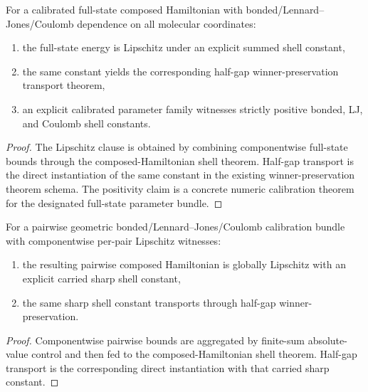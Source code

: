 \begin{theorem}\label{thm:fullstate-biomolecular-forcefield-transport}
For a calibrated full-state composed Hamiltonian with bonded/Lennard--Jones/Coulomb dependence on all molecular coordinates:
\begin{enumerate}
\item the full-state energy is Lipschitz under an explicit summed shell constant,
\item the same constant yields the corresponding half-gap winner-preservation transport theorem,
\item an explicit calibrated parameter family witnesses strictly positive bonded, LJ, and Coulomb shell constants.
\end{enumerate}
\end{theorem}

\begin{proof}
The Lipschitz clause is obtained by combining componentwise full-state bounds through the composed-Hamiltonian shell theorem. Half-gap transport is the direct instantiation of the same constant in the existing winner-preservation theorem schema. The positivity claim is a concrete numeric calibration theorem for the designated full-state parameter bundle.
\end{proof}

\begin{theorem}\label{thm:pairwise-geometric-forcefield-transport}
For a pairwise geometric bonded/Lennard--Jones/Coulomb calibration bundle with componentwise per-pair Lipschitz witnesses:
\begin{enumerate}
\item the resulting pairwise composed Hamiltonian is globally Lipschitz with an explicit carried sharp shell constant,
\item the same sharp shell constant transports through half-gap winner-preservation.
\end{enumerate}
\end{theorem}

\begin{proof}
Componentwise pairwise bounds are aggregated by finite-sum absolute-value control and then fed to the composed-Hamiltonian shell theorem. Half-gap transport is the corresponding direct instantiation with that carried sharp constant.
\end{proof}

